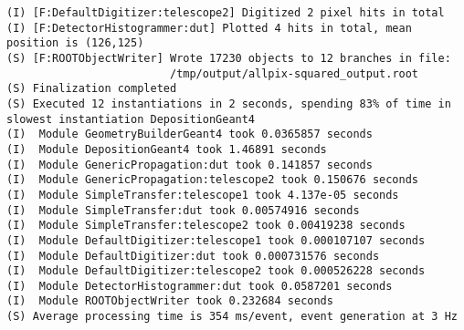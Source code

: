 \begin{lstlisting}[breaklines]
(I) [F:DefaultDigitizer:telescope2] Digitized 2 pixel hits in total
(I) [F:DetectorHistogrammer:dut] Plotted 4 hits in total, mean position is (126,125)
(S) [F:ROOTObjectWriter] Wrote 17230 objects to 12 branches in file:
                         /tmp/output/allpix-squared_output.root
(S) Finalization completed
(S) Executed 12 instantiations in 2 seconds, spending 83% of time in slowest instantiation DepositionGeant4
(I)  Module GeometryBuilderGeant4 took 0.0365857 seconds
(I)  Module DepositionGeant4 took 1.46891 seconds
(I)  Module GenericPropagation:dut took 0.141857 seconds
(I)  Module GenericPropagation:telescope2 took 0.150676 seconds
(I)  Module SimpleTransfer:telescope1 took 4.137e-05 seconds
(I)  Module SimpleTransfer:dut took 0.00574916 seconds
(I)  Module SimpleTransfer:telescope2 took 0.00419238 seconds
(I)  Module DefaultDigitizer:telescope1 took 0.000107107 seconds
(I)  Module DefaultDigitizer:dut took 0.000731576 seconds
(I)  Module DefaultDigitizer:telescope2 took 0.000526228 seconds
(I)  Module DetectorHistogrammer:dut took 0.0587201 seconds
(I)  Module ROOTObjectWriter took 0.232684 seconds
(S) Average processing time is 354 ms/event, event generation at 3 Hz
\end{lstlisting}
